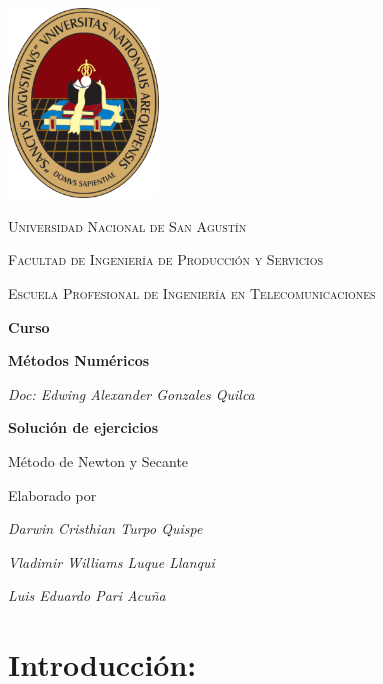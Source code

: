 \documentclass[12pt,a4paper,twoside]{article}  %
\begin{document}
\begin{titlepage}
  \centering
  \includegraphics[width=0.3\textwidth]{unsa-logo.png}\par\vspace{1cm}
  {\scshape\LARGE Universidad Nacional de San Agustín \par}
  {\scshape\Large Facultad de Ingeniería de Producción y Servicios\par}
  {\scshape\large Escuela Profesional de Ingeniería en Telecomunicaciones \par}
  \vspace{0.5cm}
  {\Large\bfseries Curso \par}
  {\Large\bfseries Métodos Numéricos  \par}
  \vspace{0.5cm}
  {\Large\itshape Doc: Edwing Alexander Gonzales Quilca \par}
  \vspace{0.5cm}
  {\Large\bfseries Solución de ejercicios \par}
  \vspace{0.5cm}
  {\Large Método de Newton y Secante\par}

  \vspace{2cm}

  Elaborado por\par
  {\Large\itshape Darwin Cristhian Turpo Quispe \par}
  {\Large\itshape Vladimir Williams Luque Llanqui \par}
  {\Large\itshape Luis Eduardo Pari Acuña \par}
  
\end{titlepage}



\newpage
\tableofcontents




\newpage
\section{Introducción:}
\end{document}
